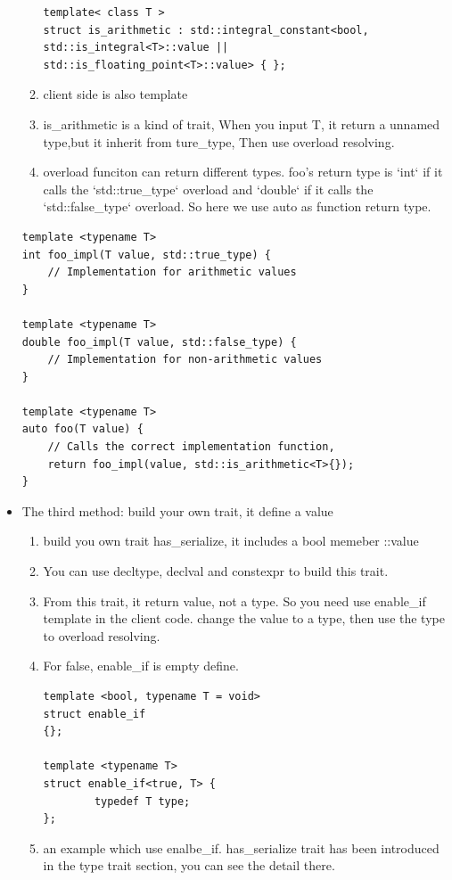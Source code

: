 \documentclass[a4paper,11pt,twoside]{book}
\begin{document}
\begin{itemize}
\begin{enumerate}
\begin{lstlisting}[numbers=none]
template< class T >
struct is_arithmetic : std::integral_constant<bool,
std::is_integral<T>::value ||
std::is_floating_point<T>::value> { };
\end{lstlisting}
		
		\item client side is also template
		\item is\_arithmetic is a kind of trait, When you input T, it return a unnamed type,but it inherit from ture\_type, Then use overload resolving.
		\item overload funciton can return different types. foo's return type is `int` if it calls the `std::true\_type` overload and `double` if it calls the `std::false\_type` overload. So here we use auto as function return type.
	\end{enumerate}
\begin{lstlisting}[numbers=none]
template <typename T>
int foo_impl(T value, std::true_type) {
	// Implementation for arithmetic values
}
	
template <typename T>
double foo_impl(T value, std::false_type) {
	// Implementation for non-arithmetic values
}
	
template <typename T>
auto foo(T value) {
	// Calls the correct implementation function, 
	return foo_impl(value, std::is_arithmetic<T>{});
}
	\end{lstlisting}
	
	\item The third method: build your own trait, it define a value
	\begin{enumerate}
		\item build you own trait has\_serialize, it includes a bool memeber ::value
		
		\item You can use decltype, declval and constexpr to build this trait. 
		\item From this trait, it return value, not a type. So you need use enable\_if template in the client code. change the value to a type, then use the type to overload resolving.
		
		\item For false, enable\_if is empty define.
\begin{lstlisting}[numbers=none]
template <bool, typename T = void>
struct enable_if
{};
		
template <typename T>
struct enable_if<true, T> {
		typedef T type;
};
\end{lstlisting}

\item an example which use enalbe\_if. has\_serialize trait has been introduced in the type trait section, you can see the detail there. 


\end{enumerate}
\end{itemize}
\end{document}
